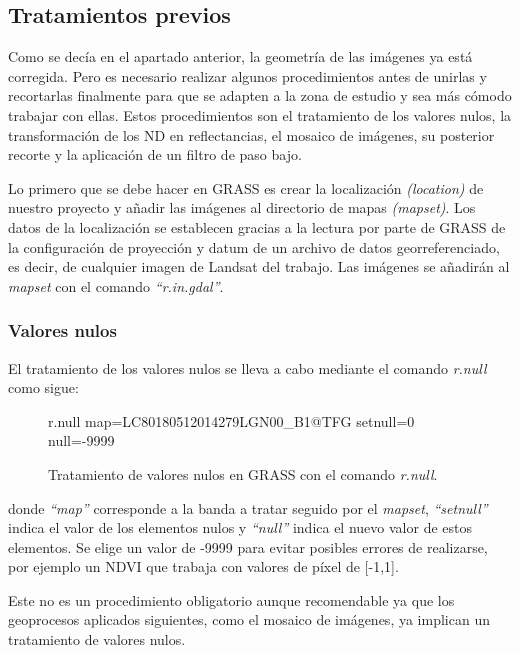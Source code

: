 \subsection{Tratamientos previos}
Como se decía en el apartado anterior, la geometría de las imágenes ya está corregida. Pero es necesario realizar algunos procedimientos antes de unirlas y recortarlas finalmente para que se adapten a la zona de estudio y sea más cómodo trabajar con ellas. Estos procedimientos son el tratamiento de los valores nulos, la transformación de los \ac{ND} en reflectancias, el mosaico de imágenes, su posterior recorte y la aplicación de un filtro de paso bajo.\Sep

Lo primero que se debe hacer en GRASS es crear la localización \textit{(location)} de nuestro proyecto y añadir las imágenes al directorio de mapas \textit{(mapset)}. Los datos de la localización se establecen gracias a la lectura por parte de GRASS de la configuración de proyección y datum de un archivo de datos georreferenciado, es decir, de cualquier imagen de Landsat del trabajo. Las imágenes se añadirán al \textit{mapset} con el comando \textit{``r.in.gdal''}.

\subsubsection{Valores nulos}
El tratamiento de los valores nulos se lleva a cabo mediante el comando \textit{r.null} como sigue:

\begin{figure}[h]
\centering
\begin{boxedverbatim}
	r.null map=LC80180512014279LGN00_B1@TFG setnull=0 null=-9999
\end{boxedverbatim}
\caption[Valores nulos]{Tratamiento de valores nulos en GRASS con el comando \textit{r.null}.}
\end{figure}

donde \textit{``map''} corresponde a la banda a tratar seguido por el \textit{mapset}, \textit{``setnull''} indica el valor de los elementos nulos y \textit{``null''} indica el nuevo valor de estos elementos. Se elige un valor de -9999 para evitar posibles errores de realizarse, por ejemplo un \ac{NDVI} que trabaja con valores de píxel de [-1,1].\Sep

Este no es un procedimiento obligatorio aunque recomendable ya que los geoprocesos aplicados siguientes, como el mosaico de imágenes, ya implican un tratamiento de valores nulos.

